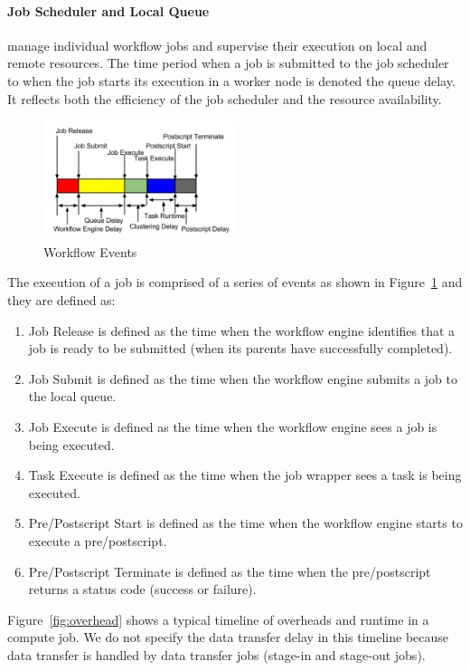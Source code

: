\paragraph{Job Scheduler and Local Queue} manage individual workflow jobs and supervise their execution on local and remote resources. The time period when a job is submitted to the job scheduler to when the job starts its execution in a worker node is denoted the queue delay. It reflects both the efficiency of the job scheduler and the resource availability. 


\begin{figure}[h!]
	\centering
    \includegraphics[width=0.5\textwidth]{figures/model/overhead.pdf}
    \caption{Workflow Events}
    \label{fig:model_overhead}
\end{figure}


The execution of a job is comprised of a series of events as shown in Figure~\ref{fig:model_overhead} and they are defined as:

\begin{enumerate}
\item Job Release is defined as the time when the workflow engine identifies that a job is ready to be submitted (when its parents have successfully completed). 
\item Job Submit is defined as the time when the workflow engine submits a job to the local queue. 
\item Job Execute is defined as the time when the workflow engine sees a job is being executed. 
\item Task Execute is defined as the time when the job wrapper sees a task is being executed. 
\item Pre/Postscript Start is defined as the time when the workflow engine starts to execute a pre/postscript. 
\item Pre/Postscript Terminate is defined as the time when the pre/postscript returns a status code (success or failure). 
\end{enumerate}

Figure~\ref{fig:overhead} shows a typical timeline of overheads and runtime in a compute job. We do not specify the data transfer delay in this timeline because data transfer is handled by data transfer jobs (stage-in and stage-out jobs). 

